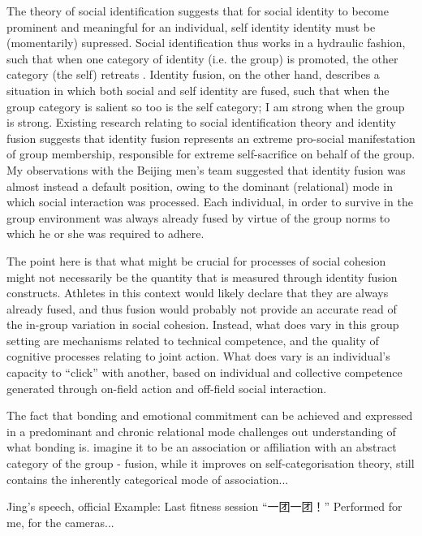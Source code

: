 The theory of social identification suggests that for social identity to become prominent and meaningful for an individual, self identity identity must be (momentarily) supressed.  Social identification thus works in a hydraulic fashion, such that when one category of identity (i.e. the group) is promoted, the other category (the self) retreats \citep{Swann2009}.  Identity fusion, on the other hand, describes a situation in which both social and self identity are fused, such that when the group category is salient so too is the self category; I am strong when the group is strong.  Existing research relating to social identification theory and identity fusion suggests that identity fusion represents an extreme pro-social manifestation of group membership, responsible for extreme self-sacrifice on behalf of the group.  My observations with the Beijing men's team suggested that identity fusion was almost instead a default position, owing to the dominant (relational) mode in which social interaction was processed.  Each individual, in order to survive in the group environment was always already fused by virtue of the group norms to which he or she was required to adhere.

The point here is that what might be crucial for processes of social cohesion might not necessarily be the quantity that is measured through identity fusion constructs. Athletes in this context would likely declare that they are always already fused, and thus fusion would probably not provide an accurate read of the in-group variation in social cohesion. Instead, what does vary in this group setting are mechanisms related to technical competence, and the quality of cognitive processes relating to joint action.  What does vary is an individual's capacity to ``click'' with another, based on individual and collective competence generated through on-field action and off-field social interaction.

The fact that bonding and emotional commitment can be achieved and expressed in a predominant and chronic relational mode challenges out understanding of what bonding is.  imagine it to be an association or affiliation with an abstract  category of the group - fusion, while it improves on self-categorisation theory, still contains the inherently categorical mode of association...





Jing's speech, official
Example: Last fitness session ``一团一团！''
Performed for me, for the cameras...






